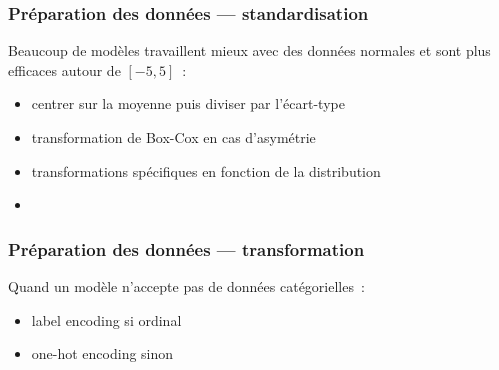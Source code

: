 \documentclass{formation}
\begin{document}
\begin{frame}
  \frametitle{Préparation des données — standardisation}

  Beaucoup de modèles travaillent mieux avec des données normales et
  sont plus efficaces autour de $[-5, 5]$ :

  \begin{itemize}
  \item centrer sur la moyenne puis diviser par l'écart-type
  \item transformation de Box-Cox en cas d'asymétrie
  \item transformations spécifiques en fonction de la distribution
  \item {}
  \end{itemize}
\end{frame}

\begin{frame}
  \frametitle{Préparation des données — transformation}

  Quand un modèle n'accepte pas de données catégorielles :

  \begin{itemize}
  \item label encoding si ordinal
  \item one-hot encoding sinon
  \end{itemize}
\end{frame}
\end{document}
